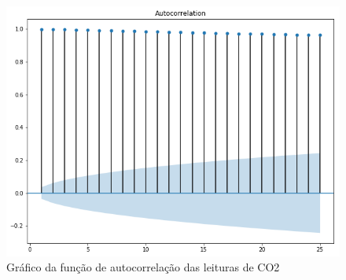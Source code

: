 \documentclass[
	12pt,
	oneside,
	a4paper,
	english,
	brazil
]{abntex2}
\begin{document}
\begin{figure}
    \centering
    \caption{Gráfico da função de autocorrelação das leituras de 
    CO2}\label{fig:correlogramaCo2}
    \includegraphics[width=.6\linewidth]{images/acf_co2.png}
\end{figure}

\postextual


\end{document}
